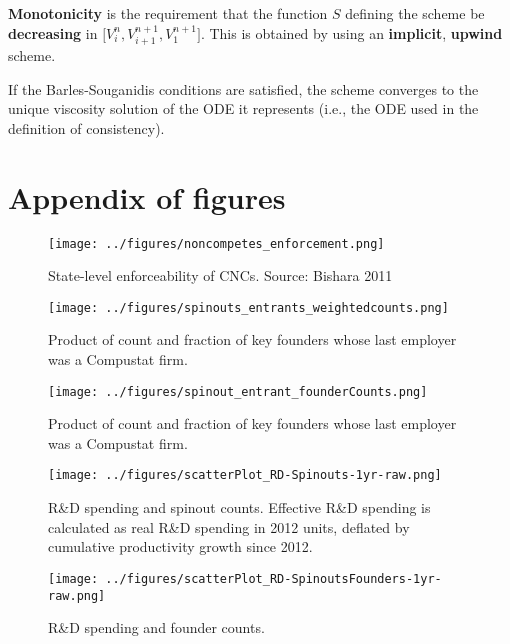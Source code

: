 \documentclass[12pt,english]{article}
\theoremstyle{remark}
\begin{document}
\textbf{Monotonicity} is the requirement that the function $S$ defining the scheme be \textbf{decreasing} in $\big[V_i^n, V_{i+1}^{n+1}, V_1^{n+1}\big]$. This is obtained by using an \textbf{implicit}, \textbf{upwind} scheme. 

If the Barles-Souganidis conditions are satisfied, the scheme converges to the unique viscosity solution of the ODE it represents (i.e., the ODE used in the definition of consistency). 







\section{Appendix of figures}\renewcommand{\thetable}{A\arabic{table}}

\renewcommand\thefigure{\thesection.\arabic{figure}}  
\setcounter{figure}{0}


\begin{figure}	
	\center
	\caption{State-level enforceability of CNCs. Source: Bishara 2011}
	\texttt{[image: ../figures/noncompetes\_enforcement.png]}
	\label{noncompetes_enforcement}
\end{figure}

\begin{figure}[h]
	\centering
	\texttt{[image: ../figures/spinouts\_entrants\_weightedcounts.png]}
	\caption{Product of count and fraction of key founders whose last employer was a Compustat firm.}
	\label{spinout_entrants_counts_weighted}
\end{figure} 

\begin{figure}[p]
	\centering
	\texttt{[image: ../figures/spinout\_entrant\_founderCounts.png]}
	\caption{Product of count and fraction of key founders whose last employer was a Compustat firm.}
	\label{spinout_entrants_foundercounts}
\end{figure}

\begin{figure}[p]
	\centering
	\texttt{[image: ../figures/scatterPlot\_RD-Spinouts-1yr-raw.png]}
	\caption{R\&D spending and spinout counts. Effective R\&D spending is calculated as real R\&D spending in 2012 units, deflated by cumulative productivity growth since 2012.}
	\label{scatter_rd_spinoutcounts}
\end{figure}

\begin{figure}[p]
	\centering
	\texttt{[image: ../figures/scatterPlot\_RD-SpinoutsFounders-1yr-raw.png]}
	\caption{R\&D spending and founder counts.}
	\label{scatter_rd_foundercounts}
\end{figure}
\end{document}
